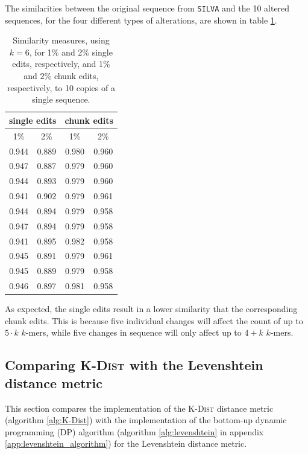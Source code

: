 The similarities between the original sequence from \texttt{SILVA} and the 10
altered sequences, for the four different types of alterations, are shown in
table \ref{tab:altered_seqs_similarities}.

\begin{table}[H]
  \centering
  \begin{tabular}{c|c||c|c}
    \multicolumn{2}{c||}{single edits}  & \multicolumn{2}{c}{chunk edits} \\
    \hline\hline
    1\%   &   2\%                   &   1\%   &   2\% \\
    \hline
    0.944   & 0.889                     & 0.980     & 0.960 \\
    0.947   & 0.887                     & 0.979     & 0.960 \\
    0.944   & 0.893                     & 0.979     & 0.960 \\
    0.941   & 0.902                     & 0.979     & 0.961 \\
    0.944   & 0.894                     & 0.979     & 0.958 \\
    0.947   & 0.894                     & 0.979     & 0.958 \\
    0.941   & 0.895                     & 0.982     & 0.958 \\
    0.945   & 0.891                     & 0.979     & 0.961 \\
    0.945   & 0.889                     & 0.979     & 0.958 \\
    0.946   & 0.897                     & 0.981     & 0.958
  \end{tabular}
  \caption{Similarity measures, using $k=6$, for 1\% and 2\% single edits, respectively,
    and 1\% and 2\% chunk edits, respectively, to 10 copies of a single
    sequence.}
  \label{tab:altered_seqs_similarities}
\end{table}

As expected, the single edits result in a lower similarity that the
corresponding chunk edits. This is because five individual changes will affect
the count of up to $5 \cdot k$ $k$-mers, while five changes in sequence will
only affect up to $4+k$ $k$-mers.


\subsection{Comparing \textsc{K-Dist} with the Levenshtein distance metric}

This section compares the implementation of the \textsc{K-Dist} distance metric
(algorithm \ref{alg:K-Dist}) with the implementation of the bottom-up dynamic
programming (DP) algorithm (algorithm \ref{alg:levenshtein} in appendix
\ref{app:levenshtein_algorithm}) for the Levenshtein distance metric.

